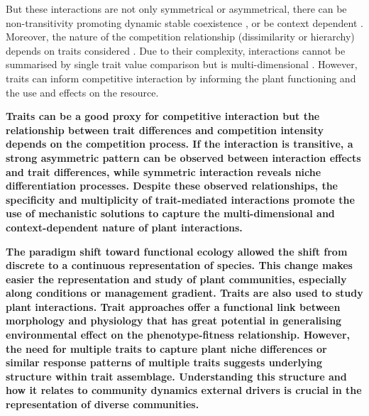 But these interactions are not only symmetrical or asymmetrical, there can be non-transitivity promoting dynamic stable coexistence \parencite{levine_beyond_2017}, or be context dependent \parencite{callaway_positive_2002}. Moreover, the nature of the competition relationship (dissimilarity or hierarchy) depends on traits considered \parencite{bennett_reciprocal_2016}. Due to their complexity, interactions cannot be summarised by single trait value comparison but is multi-dimensional \parencite{kraft_plant_2015}. However, traits can inform competitive interaction by informing the plant functioning and the use and effects on the resource.











\textbf{Traits can be a good proxy for competitive interaction but the relationship between trait differences and competition intensity depends on the competition process. If the interaction is transitive, a strong asymmetric pattern can be observed between interaction effects and trait differences, while symmetric interaction reveals niche differentiation processes. Despite these observed relationships, the specificity and multiplicity of trait-mediated interactions promote the use of mechanistic solutions to capture the multi-dimensional and context-dependent nature of plant interactions.}


\textbf{The paradigm shift toward functional ecology allowed the shift from discrete to a continuous representation of species. This change makes easier the representation and study of plant communities, especially along conditions or management gradient. Traits are also used to study plant interactions.  Trait approaches offer a functional link between morphology and physiology that has great potential in generalising environmental effect on the phenotype-fitness relationship. However, the need for multiple traits to capture plant niche differences or similar response patterns of multiple traits suggests underlying structure within trait assemblage. Understanding this structure and how it relates to community dynamics external drivers is crucial in the representation of diverse communities. } 

